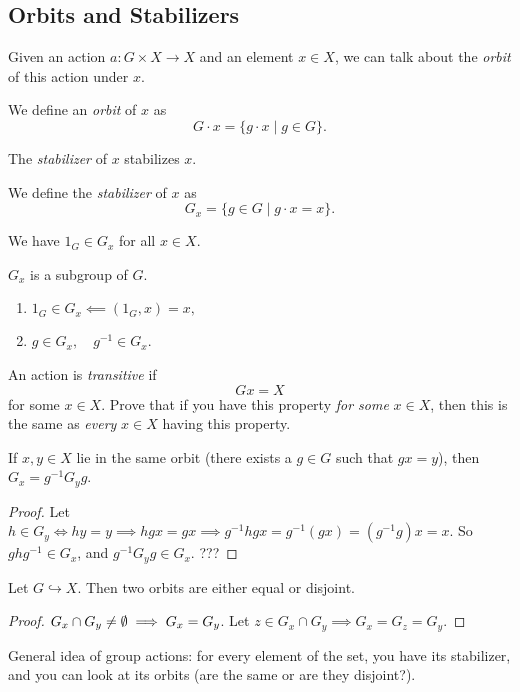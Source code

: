 \subsection{Orbits and Stabilizers}
Given an action $a \colon G\times X \to X$ and an element $x\in X$, we can talk about the \emph{orbit} of this action under $x$.
\begin{definition}[Orbits]
    We define an \emph{orbit} of $x$ as \[
    G\cdot x = \{g\cdot x \mid g\in G\}.
    \]
\end{definition}
The \emph{stabilizer} of $x$ stabilizes $x$.
\begin{definition}[Stabilizer]
    We define the \emph{stabilizer} of $x$ as \[
    G_x= \{g\in G \mid g\cdot x=x\} .
    \]
\end{definition}
\begin{remark}
 We have $1_G\in G_x$ for all $x\in X$.
\end{remark}
\begin{claim}
    $G_x$ is a subgroup of $G$.
    \begin{enumerate}
        \item $1_G\in G_x \impliedby (1_G,x)=x,$
        \item $g\in G_x, \quad g^{-1}\in G_x$.
    \end{enumerate}
\end{claim}
\begin{definition}
    An action is \emph{transitive} if \[
    Gx=X
    \]
    for some $x\in X$. Prove that if you have this property \emph{for some} $x\in X$, then this is the same as \emph{every} $x\in X$ having this property.
\end{definition}
\begin{lemma}
    If $x,y \in X$ lie in the same orbit (there exists a $g \in G$ such that $gx=y$), then $G_x=g^{-1}G_yg$.
\end{lemma}
\begin{proof}
    Let $h\in G_y \iff hy=y \implies hgx=gx \implies g^{-1}hgx=g^{-1}(gx)=(g^{-1}g)x=x$. So $ghg^{-1}\in G_x$, and $g^{-1}G_yg\in G_x$. ???
\end{proof}
\begin{lemma}
    Let $G \hookrightarrow X$. Then two orbits are either equal or disjoint.
\end{lemma}
\begin{proof}
    $G_x \cap G_y \neq \emptyset \implies  G_x=G_y$. Let $z\in G_x \cap G_y \implies G_x=G_z=G_y$.
\end{proof}
General idea of group actions: for every element of the set, you have its stabilizer, and you can look at its orbits (are the same or are they disjoint?).

